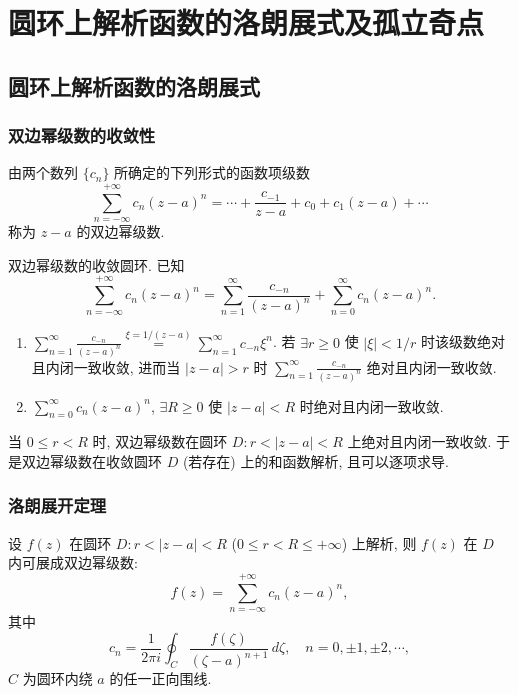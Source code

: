 \documentclass[theorem=false,mathfont=none,openany,sub3section]{easybook}
\begin{document}
\newpage

\chapter{圆环上解析函数的洛朗展式及孤立奇点}

\section{圆环上解析函数的洛朗展式}

\subsection{双边幂级数的收敛性}

\begin{definition}
  由两个数列 $\{c_{n}\}$ 所确定的下列形式的函数项级数
  \[
  \sum_{n=-\infty}^{+\infty}c_{n}(z-a)^{n}
  =\cdots+\frac{c_{-1}}{z-a}+c_{0}+c_{1}(z-a)+\cdots
  \]
  称为 $z-a$ 的双边幂级数.
\end{definition}

双边幂级数的收敛圆环. 已知
\[
\sum_{n=-\infty}^{+\infty}c_{n}(z-a)^{n}
=\sum_{n=1}^{\infty}\frac{c_{-n}}{(z-a)^{n}}+\sum_{n=0}^{\infty}c_{n}(z-a)^{n}.
\]
\begin{enumerate}
  \item $\displaystyle\sum_{n=1}^{\infty}\frac{c_{-n}}{(z-a)^{n}}\stackrel{\xi=1/(z-a)}{=}\sum_{n=1}^{\infty}c_{-n}\xi^{n}$. 若 $\exists r\geq0$ 使 $|\xi|<1/r$ 时该级数绝对且内闭一致收敛, 进而当 $|z-a|>r$ 时 $\sum_{n=1}^{\infty}\frac{c_{-n}}{(z-a)^{n}}$ 绝对且内闭一致收敛.
  \item $\sum_{n=0}^{\infty}c_{n}(z-a)^{n}$, $\exists R\geq0$ 使 $|z-a|<R$ 时绝对且内闭一致收敛.
\end{enumerate}
当 $0\leq r<R$ 时, 双边幂级数在圆环 $D:r<|z-a|<R$ 上绝对且内闭一致收敛.
于是双边幂级数在收敛圆环 $D$ (若存在) 上的和函数解析, 且可以逐项求导.

\subsection{洛朗展开定理}

\begin{theorem}[洛朗定理]
  设 $f(z)$ 在圆环 $D:r<|z-a|<R$ ($0\leq r<R\leq+\infty$) 上解析, 则 $f(z)$ 在 $D$ 内可展成双边幂级数:
  \[
  f(z)=\sum_{n=-\infty}^{+\infty}c_{n}(z-a)^{n},
  \]
  其中
  \[
  c_{n}=\frac{1}{2\pi i}\oint_{C}\frac{f(\zeta)}{(\zeta-a)^{n+1}}\,d\zeta,\quad n=0,\pm1,\pm2,\cdots,
  \]
  $C$ 为圆环内绕 $a$ 的任一正向围线.
\end{theorem}
\end{document}
